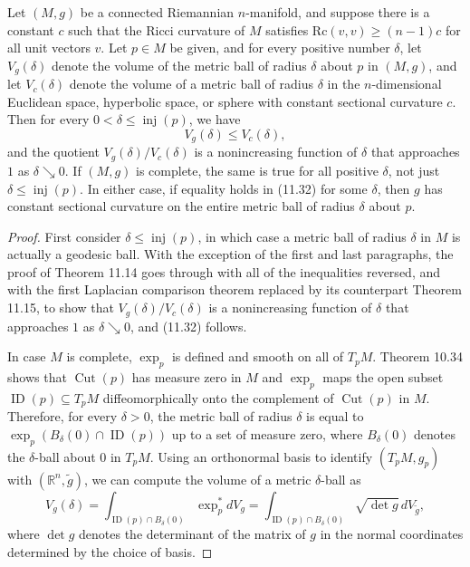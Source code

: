 \begin{theorem}
\label{thm:bishop-gromov-volume-comparison}

Let $(M,g)$ be a connected Riemannian $n$-manifold, and suppose there is a constant
$c$ such that the Ricci curvature of $M$ satisfies $\text{Rc}(v,v) \geq (n-1)c$ for all unit vectors $v$. Let $p \in M$
be given, and for every positive number $\delta$, let $V_g(\delta)$ denote the volume of the metric
ball of radius $\delta$ about $p$ in $(M,g)$, and let $V_c(\delta)$ denote the volume of a metric ball
of radius $\delta$ in the $n$-dimensional Euclidean space, hyperbolic space, or sphere with
constant sectional curvature $c$. Then for every $0 < \delta \leq \operatorname{inj}(p)$, we have
\begin{equation}
  V_g(\delta) \leq V_c(\delta), \tag{11.32}
\end{equation}
and the quotient $V_g(\delta)/V_c(\delta)$ is a nonincreasing function of $\delta$ that approaches $1$ as
$\delta \searrow 0$. If $(M,g)$ is complete, the same is true for all positive $\delta$, not just $\delta \leq \operatorname{inj}(p)$.
In either case, if equality holds in (11.32) for some $\delta$, then $g$ has constant sectional
curvature on the entire metric ball of radius $\delta$ about $p$.

\begin{proof}
First consider $\delta \leq \operatorname{inj}(p)$, in which case a metric ball of radius $\delta$ in $M$ is
actually a geodesic ball. With the exception of the first and last paragraphs, the proof
of Theorem 11.14 goes through with all of the inequalities reversed, and with the
first Laplacian comparison theorem replaced by its counterpart Theorem 11.15, to
show that $V_g(\delta)/V_c(\delta)$ is a nonincreasing function of $\delta$ that approaches $1$ as $\delta \searrow 0$,
and (11.32) follows.

In case $M$ is complete, $\exp_p$ is defined and smooth on all of $T_pM$. Theorem
10.34 shows that $\operatorname{Cut}(p)$ has measure zero in $M$ and $\exp_p$ maps the open subset
$\operatorname{ID}(p) \subseteq T_pM$ diffeomorphically onto the complement of $\operatorname{Cut}(p)$ in $M$. Therefore,
for every $\delta > 0$, the metric ball of radius $\delta$ is equal to $\exp_p\left(B_\delta(0) \cap \operatorname{ID}(p)\right)$ up to
a set of measure zero, where $B_\delta(0)$ denotes the $\delta$-ball about $0$ in $T_pM$. Using an
orthonormal basis to identify $(T_pM, g_p)$ with $(\mathbb{R}^n, \tilde{g})$, we can compute the volume
of a metric $\delta$-ball as
\[
  V_g(\delta) = \int_{\operatorname{ID}(p) \cap B_\delta(0)} \exp_p^* dV_g = \int_{\operatorname{ID}(p) \cap B_\delta(0)} \sqrt{\det g} \, dV_{\tilde{g}},
\]
where $\det g$ denotes the determinant of the matrix of $g$ in the normal coordinates
determined by the choice of basis.


\end{proof}
\end{theorem}

